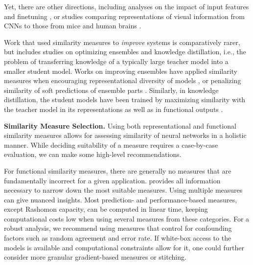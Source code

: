 \documentclass{article}
\newcommand{\subheader}{\textbf}
\begin{document}
Yet, there are other directions, including analyses on the impact of input features \cite{hermann_shapes_2020} and finetuning \cite{merchant_happens_2020}, or studies comparing representations of visual information from CNNs to those from mice \cite{shi_comparison_2019} and human brains \cite{xu_limits_2021}.

Work that used similarity measures to \emph{improve} systems is comparatively rarer, but includes studies on optimizing ensembles and knowledge distillation, i.e., the problem of transferring knowledge of a typically large teacher model into a smaller student model.
Works on improving ensembles have applied similarity measures when encouraging representational diversity of models \cite{wald_exploring_2023,do_simsmoe_2024,yang_trs_2021}, or penalizing similarity of soft predictions of ensemble parts \cite{zhang_efficient_2021}.
Similarly, in knowledge distillation, the student models have been trained by maximizing similarity with the teacher model in its representations \cite{saha_cka_distillation_2022,zhou_rethinking_2024, park_relational_2019} as well as in functional outputs \cite{zong_better_2023, gou2021knowledge}.


\subheader{Similarity Measure Selection.}
Using both representational and functional similarity measures allows for assessing similarity of neural networks in a holistic manner.
While deciding suitability of a measure requires a case-by-case evaluation, we can make some high-level recommendations.

For functional similarity measures, there are generally no measures that are fundamentally incorrect for a given application.
 provides all information necessary to narrow down the most suitable measures.
Using multiple measures can give nuanced insights.
Most prediction- and performance-based measures, except Rashomon capacity, can be computed in linear time, keeping computational costs low when using several measures from these categories.
For a robust analysis, we recommend using measures that control for confounding factors such as random agreement and error rate.
If white-box access to the models is available and computational constraints allow for it, one could further consider more granular gradient-based measures or stitching.
\end{document}
